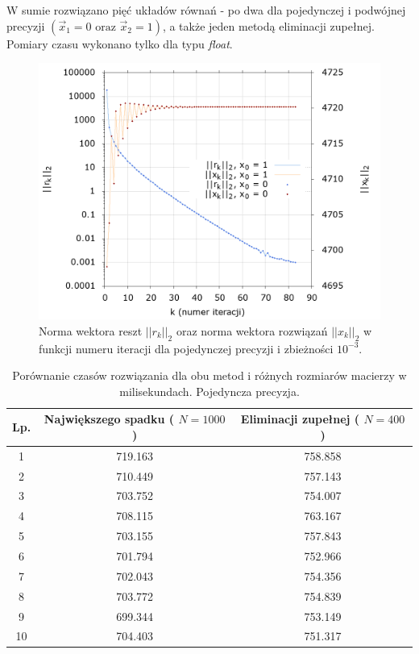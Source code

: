 W sumie rozwiązano pięć układów równań - po dwa dla pojedynczej i podwójnej precyzji $ ( \vec{x}_{1} = 0 \text{ oraz } \vec{x}_{2} = 1 ) $, a także jeden metodą eliminacji zupełnej. Pomiary czasu wykonano tylko dla typu \textit{float}.

\begin{figure}[h!]
	\begin{center}
		\includegraphics[height=0.6\linewidth]{float.png}
		\caption{Norma wektora reszt $ ||r_k||_2 $ oraz norma wektora rozwiązań $ ||x_k||_2 $ w funkcji numeru iteracji dla pojedynczej precyzji i zbieżności $ 10^{-3} $.}
		\label{float}
	\end{center}
\end{figure}

\begin{table}[!hb]
	\centering
	\begin{tabular}{|c|c|c|}
		\hline
		Lp. & Największego spadku ( $N = 1000$ )& Eliminacji zupełnej ( $N = 400$ )  \\ \hline
		1&719.163 & 758.858 \\ \hline
		2&710.449 & 757.143 \\ \hline
		3&703.752 & 754.007 \\ \hline
		4&708.115 & 763.167 \\ \hline
		5&703.155 & 757.843 \\ \hline
		6&701.794 & 752.966 \\ \hline
		7&702.043 & 754.356 \\ \hline
		8&703.772 & 754.839 \\ \hline
		9&699.344 & 753.149 \\ \hline
		10&704.403 & 751.317 \\ \hline
	\end{tabular}
	\caption{Porównanie czasów rozwiązania dla obu metod i różnych rozmiarów macierzy w milisekundach. Pojedyncza precyzja.}
	\label{tabela}
\end{table}

